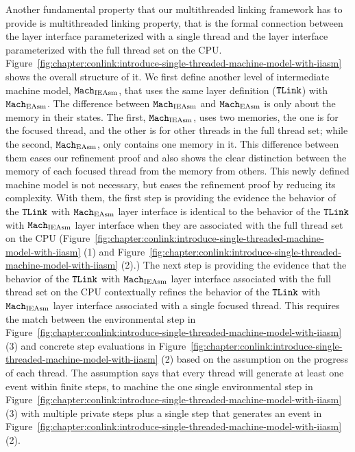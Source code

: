 Another fundamental property that our multithreaded linking framework has to provide is multithreaded linking property, that is the formal connection 
between the layer interface parameterized with a single thread and 
the layer interface parameterized with the full thread set on the CPU.
Figure~\ref{fig:chapter:conlink:introduce-single-threaded-machine-model-with-iiasm} shows the overall structure
of it.
We first define another level of intermediate machine model, ${\mathrm{\texttt{Mach}}}_{\mathrm{IEAsm}}$, that uses the same layer definition (${{\mathrm{\texttt{TLink}}}}$) with ${\mathrm{\texttt{Mach}}}_{\mathrm{EAsm}}$.
The difference between  ${\mathrm{\texttt{Mach}}}_{\mathrm{IEAsm}}$ and  ${\mathrm{\texttt{Mach}}}_{\mathrm{EAsm}}$ is only about the memory in their states. 
The first, ${\mathrm{\texttt{Mach}}}_{\mathrm{IEAsm}}$, uses two memories, the one is for the focused thread, and the other is for other threads in the full thread set; while the second, ${\mathrm{\texttt{Mach}}}_{\mathrm{EAsm}}$, only contains one memory in it. 
This difference between them eases our refinement proof and also shows the clear distinction between the memory of each focused thread from the memory from others. 
This newly defined machine model is not necessary, but eases the refinement proof by reducing its complexity.
With them,
the first step is providing the evidence
the behavior of the ${{\mathrm{\texttt{TLink}}}}$ with ${\mathrm{\texttt{Mach}}}_{\mathrm{EAsm}}$ layer interface is identical
to the   behavior of the ${{\mathrm{\texttt{TLink}}}}$ with ${\mathrm{\texttt{Mach}}}_{\mathrm{IEAsm}}$ layer interface when they are associated with the full thread set on the CPU
(Figure~\ref{fig:chapter:conlink:introduce-single-threaded-machine-model-with-iiasm}  (1) and 
Figure~\ref{fig:chapter:conlink:introduce-single-threaded-machine-model-with-iiasm}  (2).)
The next step is 
providing the evidence that 
the behavior of the ${{\mathrm{\texttt{TLink}}}}$ with ${\mathrm{\texttt{Mach}}}_{\mathrm{IEAsm}}$ layer interface associated with the full thread set on the CPU
contextually refines
the behavior of the ${{\mathrm{\texttt{TLink}}}}$ with ${\mathrm{\texttt{Mach}}}_{\mathrm{IEAsm}}$ layer interface associated with a single focused thread.
This requires the match between the environmental step in Figure~\ref{fig:chapter:conlink:introduce-single-threaded-machine-model-with-iiasm}  (3) and concrete step evaluations in  Figure~\ref{fig:chapter:conlink:introduce-single-threaded-machine-model-with-iiasm}  (2)
based on the assumption on the progress of each thread. 
The assumption says that 
every thread will generate at least one event within finite steps,
to machine the one single environmental step in Figure~\ref{fig:chapter:conlink:introduce-single-threaded-machine-model-with-iiasm}  (3)  with multiple private steps plus a single step that generates an event in  Figure~\ref{fig:chapter:conlink:introduce-single-threaded-machine-model-with-iiasm}  (2).

